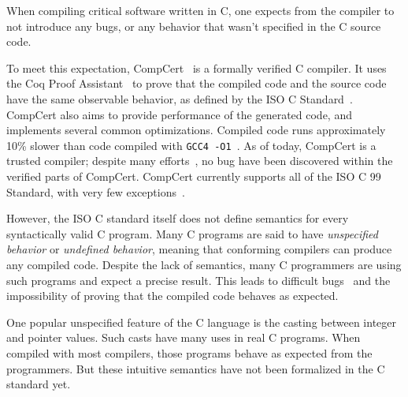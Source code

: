 When compiling critical software written in C, one expects from the compiler to not introduce any bugs, or any behavior that wasn't specified in the C source code.

To meet this expectation, CompCert~\cite{DBLP:journals/cacm/Leroy09} is a formally verified C compiler.
It uses the Coq Proof Assistant~\cite{coq} to prove that the compiled code and the source code have the same observable behavior, as defined by the ISO C Standard~\cite{iso}.
CompCert also aims to provide performance of the generated code, and implements several common optimizations. Compiled code runs approximately 10\% slower than code compiled with \texttt{GCC4 -O1}~\cite{compcertwebsite}.
As of today, CompCert is a trusted compiler; despite many efforts~\cite{DBLP:conf/pldi/YangCER11}, no bug have been discovered within the verified parts of CompCert.
CompCert currently supports all of the ISO C 99 Standard, with very few exceptions~\cite{compcertwebsite}.

However, the ISO C standard itself does not define semantics for every syntactically valid C program.
Many C programs are said to have \textit{unspecified behavior} or \textit{undefined behavior}, meaning that conforming compilers can produce any compiled code.
Despite the lack of semantics, many C programmers are using such programs and expect a precise result. %
This leads to difficult bugs~\cite{DBLP:conf/apsys/WangCCJZK12} and the impossibility of proving that the compiled code behaves as expected.

One popular unspecified feature of the C language is the casting between integer and pointer values.
Such casts have many uses in real C programs. 
When compiled with most compilers, those programs behave as expected from the programmers. But these intuitive semantics have not been formalized in the C standard yet.

